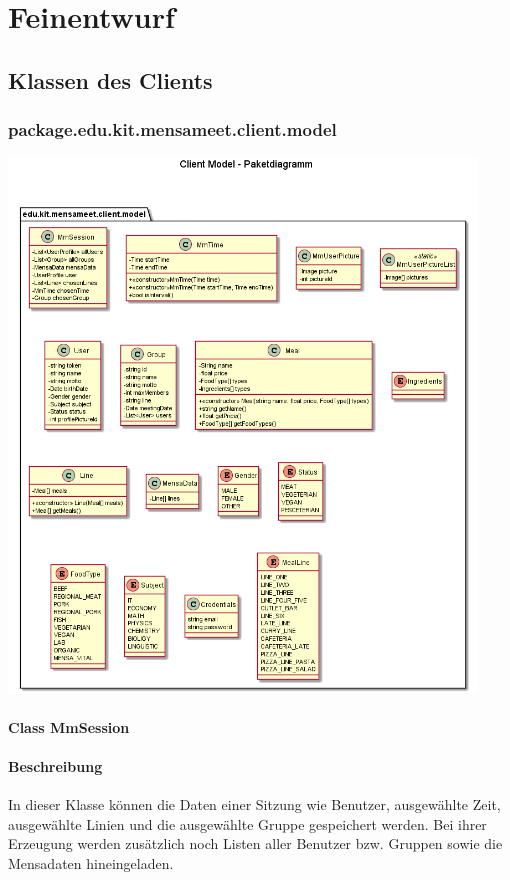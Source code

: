 \documentclass[a4paper]{scrreprt}
\begin{document}
\chapter{Feinentwurf}
\section{Klassen des Clients}


\subsection{package.edu.kit.mensameet.client.model}
\begin{center}
	\includegraphics[width=0.93\textwidth]{GUI/frontend-package-model.png}
\end{center} 


\subsubsection{Class MmSession}
\subsubsection*{Beschreibung}
In dieser Klasse können die Daten einer Sitzung wie Benutzer, ausgewählte Zeit, ausgewählte Linien und die ausgewählte Gruppe gespeichert werden. Bei ihrer Erzeugung werden zusätzlich noch Listen aller Benutzer bzw. Gruppen sowie die \Gls{Mensadaten} hineingeladen.
\end{document}
